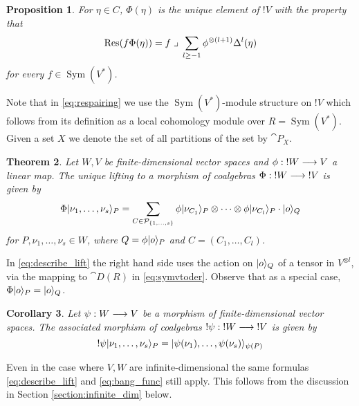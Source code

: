\documentclass[english,letter paper,12pt,reqno]{article}
\DeclarePairedDelimiter\ket{\lvert}{\rangle}
\newtheorem{theorem}{Theorem}[section]
\newtheorem{proposition}[theorem]{Proposition}
\newtheorem{corollary}[theorem]{Corollary}
\theoremstyle{example}
\numberwithin{equation}{section}
\DeclareMathOperator{\Sym}{Sym}
\begin{document}
\begin{proposition}\label{prop:respairing} For $\eta \in C$, $\Phi(\eta)$ is the unique element of ${!}V$ with the property that
\begin{equation}\label{eq:respairing}
\operatorname{Res}\!\,( f \Phi(\eta) ) = f\; \lrcorner \;\sum_{l \ge -1} \phi^{\otimes (l+1)} \Delta^l(\eta)
\end{equation}
for every $f \in \Sym(V^*)$.
\end{proposition}

Note that in \eqref{eq:respairing} we use the $\Sym(V^*)$-module structure on ${!} V$ which follows from its definition as a local cohomology module over $R = \Sym(V^*)$. Given a set $X$ we denote the set of all partitions of the set by $\cat{P}_X$.

\begin{theorem}\label{theorem:describe_lifting} Let $W, V$ be finite-dimensional vector spaces and $\phi: {!}W \longrightarrow V$ a linear map. The unique lifting to a morphism of coalgebras $\Phi: {!}W \longrightarrow {!}V$ is given by
\begin{equation}\label{eq:describe_lift}
\Phi \ket{ \nu_1, \ldots, \nu_s }_P = \sum_{C \in \cat{P}_{\{1,\ldots,s\}}} \phi \ket{ \nu_{C_{1}} }_P \otimes \cdots \otimes \phi \ket{ \nu_{C_{l}} }_P \cdot \ket{o}_Q
\end{equation}
for $P, \nu_1,\ldots,\nu_s \in W$, where $Q = \phi \ket{o}_P$ and $C = (C_1,\ldots,C_l)$.
\end{theorem}

In \eqref{eq:describe_lift} the right hand side uses the action on $\ket{o}_Q$ of a tensor in $V^{\otimes l}$, via the mapping to $\cat{D}(R)$ in \eqref{eq:symvtoder}. Observe that as a special case, $\Phi \ket{o}_P = \ket{o}_Q$.

\begin{corollary}\label{corollary:bang_func} Let $\psi: W \longrightarrow V$ be a morphism of finite-dimensional vector spaces. The associated morphism of coalgebras $!\psi: {!}W \longrightarrow {!}V$ is given by
\begin{equation}\label{eq:bang_func}
!\psi \ket{\nu_1, \ldots, \nu_s}_P = \ket{ \psi(\nu_{1}), \ldots, \psi(\nu_{s}) }_{\psi(P)}
\end{equation}
\end{corollary}

Even in the case where $V, W$ are infinite-dimensional the same formulas \eqref{eq:describe_lift} and \eqref{eq:bang_func} still apply. This follows from the discussion in Section \ref{section:infinite_dim} below.
\end{document}
